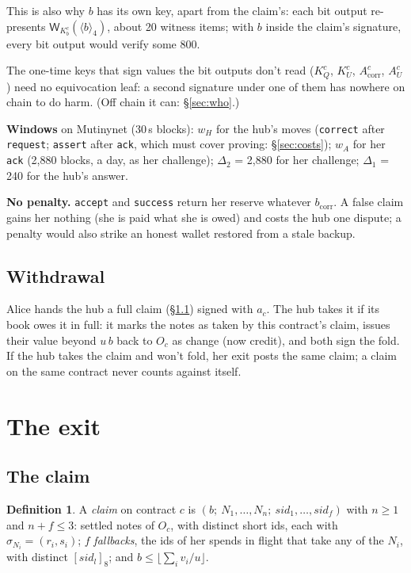 \documentclass[11pt]{article}
\theoremstyle{plain}
\theoremstyle{definition}
\newtheorem{definition}{Definition}
\newcommand{\bcorr}{b_{\mathrm{corr}}}
\newcommand{\tx}[1]{\texttt{#1}}
\newcommand{\be}[2]{\langle #1\rangle_{#2}}
\newcommand{\pre}[2]{[#1]_{#2}}
\newcommand{\Wots}{\mathsf{W}}
\newcommand{\sid}{\mathit{sid}}
\newcommand{\Oc}{O_c}
\newcommand{\KQ}{K_{Q}^{c}}
\newcommand{\Kb}{K_{b}^{c}}
\newcommand{\KU}{K_{U}^{c}}
\newcommand{\Acorr}{A_{\mathrm{corr}}^{c}}
\newcommand{\AU}{A_{U}^{c}}
\begin{document}
This is also why $b$ has its own key, apart from the claim's: each bit
output re-presents $\Wots_{\Kb}(\be{b}{4})$, about 20 witness items; with
$b$ inside the claim's signature, every bit output would verify some
800.

The one-time keys that sign values the bit outputs don't read ($\KQ$,
$\KU$, $\Acorr$, $\AU$) need no equivocation leaf: a second signature
under one of them has nowhere on chain to do harm. (Off chain it can:
\S\ref{sec:who}.)

\textbf{Windows} on Mutinynet (30\,s blocks): $w_H$ for the hub's moves
(\tx{correct} after \tx{request}; \tx{assert} after \tx{ack}, which must
cover proving: \S\ref{sec:costs}); $w_A$ for her \tx{ack} (2,880 blocks,
a day, as her challenge); $\Delta_2$ = 2,880 for her challenge;
$\Delta_1$ = 240 for the hub's answer.

\textbf{No penalty.} \tx{accept} and \tx{success} return her reserve
whatever $\bcorr$. A false claim
gains her nothing (she is paid what she is owed) and costs the hub one
dispute; a penalty would also strike an honest wallet restored from a
stale backup.

\subsection{Withdrawal}\label{sec:withdrawal}

Alice hands the hub a full claim (\S\ref{sec:claim}) signed with $a_c$.
The hub takes it if its book owes it in full: it marks the notes as
taken by this contract's claim, issues their value beyond $u\,b$ back to
$\Oc$ as change (now credit), and both sign the fold. If the hub takes
the claim and won't fold, her exit posts the same claim; a claim on the
same contract never counts against itself.

\section{The exit}\label{sec:exit}

\subsection{The claim}\label{sec:claim}

\begin{definition}
A \emph{claim} on contract $c$ is $(b;\ N_1, \dots, N_n;\ \sid_1, \dots,
\sid_f)$ with $n \ge 1$ and $n + f \le 3$: settled notes of $\Oc$, with
distinct short ids, each with $\sigma_{N_i} = (r_i, s_i)$; $f$
\emph{fallbacks}, the ids of her spends in flight that take any of the
$N_i$, with distinct $\pre{\sid_l}{8}$; and $b \le \lfloor \sum_i v_i /
u\rfloor$.
\end{definition}
\end{document}
